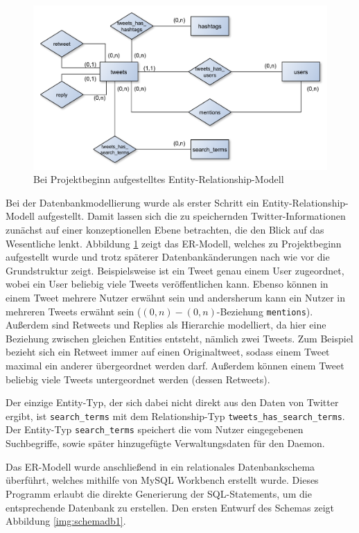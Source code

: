 \begin{figure}[th]
\includegraphics[width=\textwidth]{Bilder/Datenbank/ERM_Datenbank.pdf}
\caption{Bei Projektbeginn aufgestelltes Entity-Relationship-Modell}
\label{img:ERM_DB}
\end{figure}

Bei der Datenbankmodellierung wurde als erster Schritt ein Entity-Relationship-Modell aufgestellt.
Damit lassen sich die zu speichernden Twitter-Informationen zunächst auf einer konzeptionellen Ebene betrachten, die den Blick auf das Wesentliche lenkt.
Abbildung \ref{img:ERM_DB} zeigt das ER-Modell, welches zu Projektbeginn aufgestellt wurde und trotz späterer Datenbankänderungen nach wie vor die Grundstruktur zeigt.
Beispielsweise ist ein Tweet genau einem User zugeordnet, wobei ein User beliebig viele Tweets veröffentlichen kann.
Ebenso können in einem Tweet mehrere Nutzer erwähnt sein und andersherum kann ein Nutzer in mehreren Tweets erwähnt sein ($(0,n)-(0,n)$-Beziehung \texttt{mentions}).
Außerdem sind Retweets und Replies als Hierarchie modelliert, da hier eine Beziehung zwischen gleichen Entities entsteht, nämlich zwei Tweets.
Zum Beispiel bezieht sich ein Retweet immer auf einen Originaltweet, sodass einem Tweet maximal ein anderer übergeordnet werden darf.
Außerdem können einem Tweet beliebig viele Tweets untergeordnet werden (dessen Retweets).

Der einzige Entity-Typ, der sich dabei nicht direkt aus den Daten von Twitter ergibt, ist \texttt{search\_terms} mit dem Relationship-Typ \texttt{tweets\_has\_search\_terms}.
Der Entity-Typ \texttt{search\_terms} speichert die vom Nutzer eingegebenen Suchbegriffe, sowie später hinzugefügte Verwaltungsdaten für den Daemon.

Das ER-Modell wurde anschließend in ein relationales Datenbankschema überführt, welches mithilfe von MySQL Workbench erstellt wurde.
Dieses Programm erlaubt die direkte Generierung der SQL-Statements, um die entsprechende Datenbank zu erstellen. 
Den ersten Entwurf des Schemas zeigt Abbildung \ref{img:schemadb1}.


